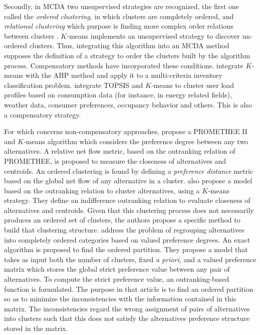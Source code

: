 \documentclass[]{elsarticle}
\theoremstyle{definition}
\begin{document}
Secondly, in MCDA two unsupervised strategies are recognized, the first one called the \emph{ordered clustering}, in which clusters are completely ordered, and  \emph{relational clustering} which purpose is finding more complex order relations between clusters \citep{zopounidis2002, DeSmet2009}. $K$-means implements an unsupervised strategy to discover un-ordered clusters. Thus, integrating this algorithm into an MCDA method supposes the definition of a strategy to order the clusters built by the algorithm process.  Compensatory methods have incorporated these conditions.  \cite{Lolli2014} integrate $K$-means with the AHP method and apply it to a multi-criteria inventory classification problem. \cite{Panapakidis2018} integrate TOPSIS and $K$-means to cluster user load profiles based on consumption data (for instance, in energy related fields), weather data, consumer preferences, occupancy behavior and others. This is also a compensatory strategy.

For which concerns non-compensatory approaches, \cite{Chen2018} propose a PROMETHEE II and $K$-means algorithm which considers the preference degree between any two alternatives. A relative net flow metric, based on the outranking relation of PROMETHEE, is proposed to measure the closeness of alternatives and centroids. An ordered clustering is found by defining a \emph{preference distance} metric based on the global net flow of any alternative in a cluster.  \cite{Fernandez2010} also propose a model based on the outranking relation to cluster alternatives, using a $K$-means strategy. They define an indifference outranking relation to evaluate closeness of alternatives and centroids. Given that this clustering process does not necessarily produces an ordered set of clusters, the authors propose a specific method to build that clustering structure.  \cite{DeSmet2012} address the problem of regrouping alternatives into completely ordered categories based on valued preference degrees. An exact algorithm is proposed to find the ordered partition. They propose a model that takes as input both the number of clusters, fixed \emph{a priori}, and a valued preference matrix which stores the global strict preference value between any pair of alternatives. To compute the strict preference value, an outranking-based function is formulated. The purpose in that article is to find an ordered partition so as to minimize the inconsistencies with the information contained in this matrix. The inconsistencies regard the wrong assignment of pairs of alternatives into clusters  such that this does not satisfy the alternatives preference structure stored in the matrix. 
\end{document}
